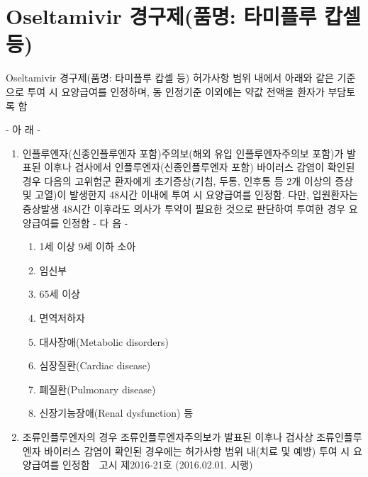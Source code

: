 ﻿\section{Oseltamivir 경구제(품명: 타미플루 캅셀 등)}

\begin{commentbox}{Oseltamivir 경구제(품명: 타미플루 캅셀 등)}
허가사항 범위 내에서 아래와 같은 기준으로 투여 시 요양급여를 인정하며, 동 인정기준 이외에는 약값 전액을 환자가 부담토록 함\par
\begin{center} - 아 래 - \end{center}
\begin{enumerate}[가.]\tightlist
\item 인플루엔자(신종인플루엔자 포함)주의보(해외 유입 인플루엔자주의보 포함)가 발표된 이후나 검사에서 인플루엔자(신종인플루엔자 포함) 바이러스 감염이 확인된 경우 다음의 고위험군 환자에게 초기증상(기침, 두통, 인후통 등 2개 이상의 증상 및 고열)이 발생한지 48시간 이내에 투여 시 요양급여를 인정함. 다만, 입원환자는 증상발생 48시간 이후라도 의사가 투약이 필요한 것으로 판단하여 투여한 경우 요양급여를 인정함 \newline
- 다 음 -
	\begin{enumerate}[1)]\tightlist
	\item 1세 이상 9세 이하 소아
	\item 임신부
	\item 65세 이상
	\item 면역저하자
	\item 대사장애(Metabolic disorders)
	\item 심장질환(Cardiac disease)
	\item 폐질환(Pulmonary disease)
	\item 신장기능장애(Renal dysfunction) 등
	\end{enumerate}
\item 조류인플루엔자의 경우
조류인플루엔자주의보가 발표된 이후나 검사상 조류인플루엔자 바이러스 감염이 확인된 경우에는 허가사항 범위 내(치료 및 예방) 투여 시 요양급여를 인정함
 고시 제2016-21호 (2016.02.01. 시행)
\end{enumerate}
\end{commentbox}
